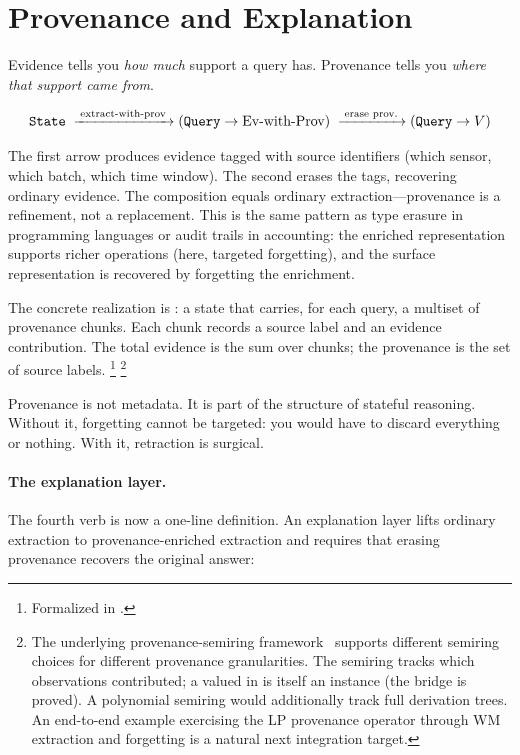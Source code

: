 \documentclass[11pt,openany]{report}
\begin{document}
\section{Provenance and Explanation}
\label{sec:provenance}

Evidence tells you \emph{how much} support a query has.  Provenance
tells you \emph{where that support came from}.

\[
  \texttt{State}
  \;\xrightarrow{\;\text{extract-with-prov}\;}
  (\texttt{Query} \to \text{Ev-with-Prov})
  \;\xrightarrow{\;\text{erase prov.}\;}
  (\texttt{Query} \to V)
\]

\noindent
The first arrow produces evidence tagged with source identifiers
(which sensor, which batch, which time window).  The second erases
the tags, recovering ordinary evidence.  The composition equals
ordinary extraction---provenance is a refinement, not a replacement.
This is the same pattern as type erasure in programming languages or
audit trails in accounting: the enriched representation supports
richer operations (here, targeted forgetting), and the surface
representation is recovered by forgetting the enrichment.

The concrete realization is : a state that
carries, for each query, a multiset of provenance chunks.  Each chunk
records a source label and an evidence contribution.  The total
evidence is the sum over chunks; the provenance is the set of source
labels.%
\footnote{Formalized in
.}%
\footnote{The underlying provenance-semiring
framework~\cite{GreenKarvounarakisTannen2007} supports different
semiring choices for different provenance granularities.  The
 semiring tracks which observations contributed; a
 valued in  is itself an
 instance (the bridge is proved).  A
polynomial semiring would additionally track full derivation trees.
An end-to-end example exercising the LP provenance operator
 through WM extraction and forgetting is a natural
next integration target.}

Provenance is not metadata.  It is part of the structure of stateful
reasoning.  Without it, forgetting cannot be targeted: you would have
to discard everything or nothing.  With it, retraction is surgical.

\paragraph{The explanation layer.}
The fourth verb is now a one-line definition.  An explanation layer
lifts ordinary extraction to provenance-enriched extraction and
requires that erasing provenance recovers the original answer:
\end{document}
